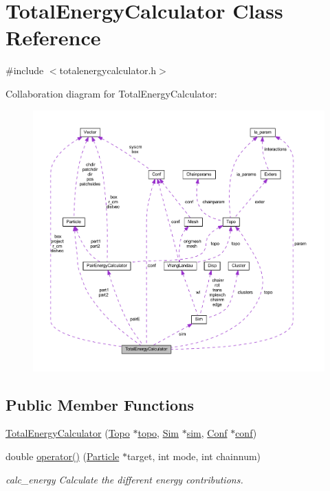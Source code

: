 \hypertarget{class_total_energy_calculator}{\section{Total\+Energy\+Calculator Class Reference}
\label{class_total_energy_calculator}
}


{\ttfamily \#include $<$totalenergycalculator.\+h$>$}



Collaboration diagram for Total\+Energy\+Calculator\+:\nopagebreak
\begin{figure}[H]
\begin{center}
\leavevmode
\includegraphics[width=350pt]{class_total_energy_calculator__coll__graph}
\end{center}
\end{figure}
\subsection*{Public Member Functions}
\begin{DoxyCompactItemize}
\item 
\hyperlink{class_total_energy_calculator_a0cb93271cde50b1c5141d13b8b57cf5e}{Total\+Energy\+Calculator} (\hyperlink{struct_topo}{Topo} $\ast$\hyperlink{class_total_energy_calculator_aed85fe4b47789143751a8da4f533e615}{topo}, \hyperlink{struct_sim}{Sim} $\ast$\hyperlink{class_total_energy_calculator_abc83a6fe12e76bdbff49d40667819edc}{sim}, \hyperlink{class_conf}{Conf} $\ast$\hyperlink{class_total_energy_calculator_ae868ad495fea34a95ccbee693e9ef9ae}{conf})
\item 
double \hyperlink{class_total_energy_calculator_a8cf80da65e373aac898e7254f900f6fe}{operator()} (\hyperlink{class_particle}{Particle} $\ast$target, int mode, int chainnum)
\begin{DoxyCompactList}\small\item\em calc\+\_\+energy Calculate the different energy contributions. \end{DoxyCompactList}\end{DoxyCompactItemize}

